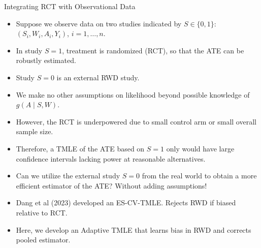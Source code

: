 \documentclass[t]{beamer}
\begin{document}
\begin{frame}{Integrating RCT with Observational Data}
\begin{itemize}
\item Suppose we observe data on two studies indicated by $S\in \{0,1\}$: $(S_i,W_i,A_i,Y_i)$, $i=1,\ldots,n$. 
\item In study $S=1$, treatment is randomized (RCT), so that the ATE can be robustly estimated.
\item Study $S=0$ is an external RWD study. 
\item We make no other assumptions on likelihood beyond possible knowledge of $g(A\mid S,W)$.
\item However, the RCT is underpowered due to small control arm or small overall sample size.\item Therefore, a TMLE of the ATE based on $S=1$ only would have large confidence intervals lacking power at reasonable alternatives. \item Can we utilize the external study $S=0$ from the real world to obtain a more efficient estimator of the ATE?  Without adding assumptions!
\end{itemize}
\end{frame}

\begin{frame}
\begin{itemize}
\item Dang et al (2023) developed an ES-CV-TMLE. Rejects RWD if biased relative to RCT.
\item Here, we develop an Adaptive TMLE that learns bias in RWD and corrects pooled estimator.
\end{itemize}
\end{frame}
\end{document}

